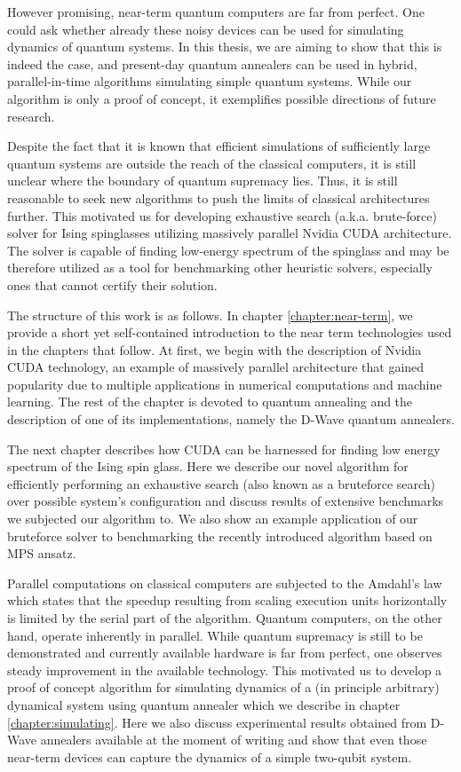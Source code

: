 However promising, near-term quantum computers are far from perfect. One could ask whether already these noisy devices can be used for simulating dynamics of quantum systems. In this thesis, we are aiming to show that this is indeed the case, and present-day quantum annealers can be used in hybrid, parallel-in-time algorithms simulating simple quantum systems. While our algorithm is only a proof of concept, it exemplifies possible directions of future research.

Despite the fact that it is known that efficient simulations of sufficiently large quantum systems are outside the reach of the classical computers, it is still unclear where the boundary of quantum supremacy lies. Thus, it is still reasonable to seek new algorithms to push the limits of classical architectures further. This motivated us for developing exhaustive search (a.k.a. brute-force) solver for Ising spinglasses utilizing massively parallel Nvidia CUDA architecture. The solver is capable of finding low-energy spectrum of the spinglass and may be therefore utilized as a tool for benchmarking other heuristic solvers, especially ones that cannot certify their solution.

The structure of this work is as follows. In chapter \ref{chapter:near-term}, we provide a short yet self-contained introduction to the near term technologies used in the chapters that follow. At first, we begin with the description of Nvidia CUDA technology, an example of massively parallel architecture that gained popularity due to multiple applications in numerical computations and machine learning. The rest of the chapter is devoted to quantum annealing and the description of one of its implementations, namely the D-Wave quantum annealers.

The next chapter describes how CUDA can be harnessed for finding low energy spectrum of the Ising spin glass. Here we describe our novel algorithm for efficiently performing an exhaustive search (also known as a bruteforce search) over possible system's configuration and discuss results of extensive benchmarks we subjected our algorithm to. We also show an example application of our bruteforce solver to benchmarking the recently introduced algorithm based on MPS ansatz.

Parallel computations on classical computers are subjected to the Amdahl's law which states that the speedup resulting from scaling execution units horizontally is limited by the serial part of the algorithm. Quantum computers, on the other hand, operate inherently in parallel. While quantum supremacy is still to be demonstrated and currently available hardware is far from perfect, one observes steady improvement in the available technology. This motivated us to develop a proof of concept algorithm for simulating dynamics of a (in principle arbitrary) dynamical system using quantum annealer which we describe in chapter \ref{chapter:simulating}. Here we also discuss experimental results obtained from D-Wave annealers available at the moment of writing and show that even those near-term devices can capture the dynamics of a simple two-qubit system.

